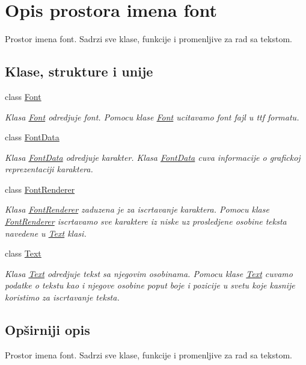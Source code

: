 \hypertarget{namespacefont}{}\section{Opis prostora imena font}
\label{namespacefont}


Prostor imena font. Sadrzi sve klase, funkcije i promenljive za rad sa tekstom.  


\subsection*{Klase, strukture i unije}
\begin{DoxyCompactItemize}
\item 
class \hyperlink{classfont_1_1Font}{Font}
\begin{DoxyCompactList}\small\item\em Klasa \hyperlink{classfont_1_1Font}{Font} odredjuje font. Pomocu klase \hyperlink{classfont_1_1Font}{Font} ucitavamo font fajl u ttf formatu. \end{DoxyCompactList}\item 
class \hyperlink{classfont_1_1FontData}{Font\+Data}
\begin{DoxyCompactList}\small\item\em Klasa \hyperlink{classfont_1_1FontData}{Font\+Data} odredjuje karakter. Klasa \hyperlink{classfont_1_1FontData}{Font\+Data} cuva informacije o grafickoj reprezentaciji karaktera. \end{DoxyCompactList}\item 
class \hyperlink{classfont_1_1FontRenderer}{Font\+Renderer}
\begin{DoxyCompactList}\small\item\em Klasa \hyperlink{classfont_1_1FontRenderer}{Font\+Renderer} zaduzena je za iscrtavanje karaktera. Pomocu klase \hyperlink{classfont_1_1FontRenderer}{Font\+Renderer} iscrtavamo sve karaktere iz niske uz prosledjene osobine teksta navedene u \hyperlink{classfont_1_1Text}{Text} klasi. \end{DoxyCompactList}\item 
class \hyperlink{classfont_1_1Text}{Text}
\begin{DoxyCompactList}\small\item\em Klasa \hyperlink{classfont_1_1Text}{Text} odredjuje tekst sa njegovim osobinama. Pomocu klase \hyperlink{classfont_1_1Text}{Text} cuvamo podatke o tekstu kao i njegove osobine poput boje i pozicije u svetu koje kasnije koristimo za iscrtavanje teksta. \end{DoxyCompactList}\end{DoxyCompactItemize}


\subsection{Opširniji opis}
Prostor imena font. Sadrzi sve klase, funkcije i promenljive za rad sa tekstom. 